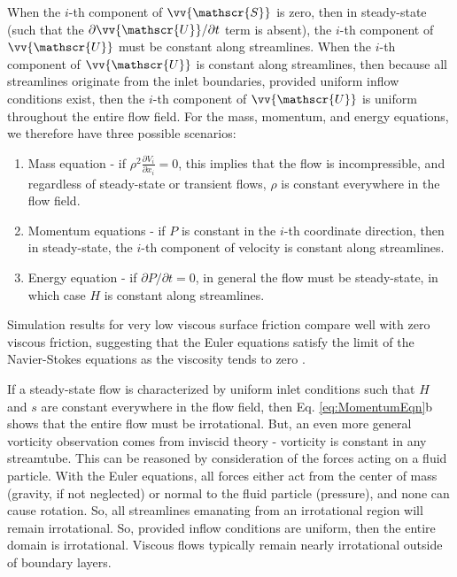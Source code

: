 \documentclass[10pt]{article}
\begin{document}
\begin{flushleft}
When the \(i\)-th component of \(\vv{\mathscr{S}}\) is zero, then in steady-state (such that the \(\partial\vv{\mathscr{U}}/\partial t\) term is absent), the \(i\)-th component of \(\vv{\mathscr{U}}\) must be constant along streamlines. When the \(i\)-th component of \(\vv{\mathscr{U}}\) is constant along streamlines, then because all streamlines originate from the inlet boundaries, provided uniform inflow conditions exist, then the \(i\)-th component of \(\vv{\mathscr{U}}\) is uniform throughout the entire flow field. For the mass, momentum, and energy equations, we therefore have three possible scenarios:

\begin{enumerate}
\item Mass equation - if \(\rho^2\frac{\partial V_i}{\partial x_i}=0\), this implies that the flow is incompressible, and regardless of steady-state or transient flows, \(\rho\) is constant everywhere in the flow field.
\item Momentum equations - if \(P\) is constant in the \(i\)-th coordinate direction, then in steady-state, the \(i\)-th component of velocity is constant along streamlines.
\item Energy equation - if \(\partial P/\partial t=0\), in general the flow must be steady-state, in which case \(H\) is constant along streamlines. 
\end{enumerate}

Simulation results for very low viscous surface friction compare well with zero viscous friction, suggesting that the Euler equations satisfy the limit of the Navier-Stokes equations as the viscosity tends to zero \cite{hoffman}.  

If a steady-state flow is characterized by uniform inlet conditions such that \(H\) and \(s\) are constant everywhere in the flow field, then Eq. \eqref{eq:MomentumEqn}b shows that the entire flow must be irrotational. But, an even more general vorticity observation comes from inviscid theory - vorticity is constant in any streamtube. This can be reasoned by consideration of the forces acting on a fluid particle. With the Euler equations, all forces either act from the center of mass (gravity, if not neglected) or normal to the fluid particle (pressure), and none can cause rotation. So, all streamlines emanating from an irrotational region will remain irrotational. So, provided inflow conditions are uniform, then the entire domain is irrotational. Viscous flows typically remain nearly irrotational outside of boundary layers.


\end{flushleft}
\end{document}
